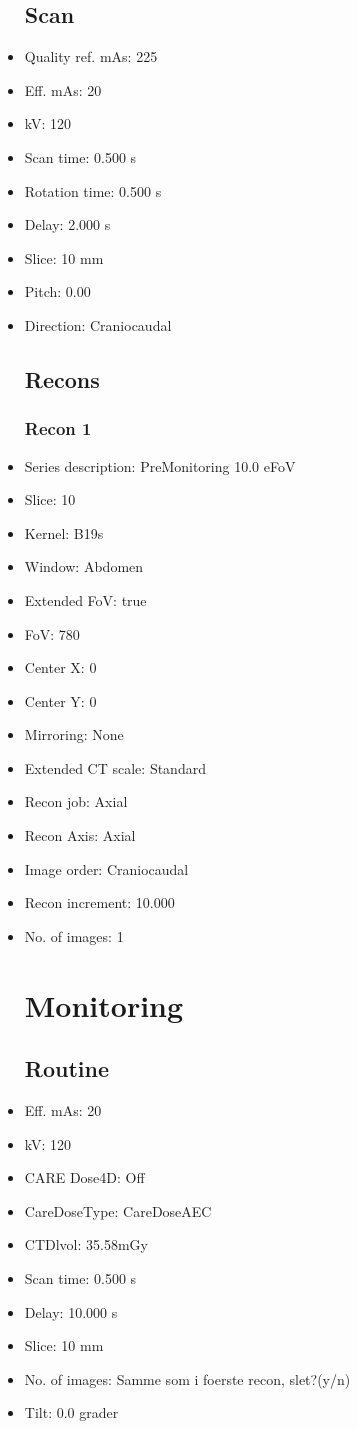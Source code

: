 \documentclass[12pt]{article}
\begin{document}
\begin{itemize}
\subsection{Scan}
\item Quality ref. mAs: 225\item Eff. mAs: 20\item kV: 120\item Scan time: 0.500 s\item Rotation time: 0.500 s\item Delay: 2.000 s\item Slice: 10 mm\item Pitch: 0.00\item Direction: Craniocaudal\subsection{Recons}

\subsubsection{Recon 1}
\item Series description: PreMonitoring 10.0 eFoV
\item Slice: 10
\item Kernel: B19s
\item Window: Abdomen
\item Extended FoV: true
\item FoV: 780
\item Center X: 0
\item Center Y: 0
\item Mirroring: None
\item Extended CT scale: Standard
\item Recon job: Axial
\item Recon Axis: Axial
\item Image order: Craniocaudal
\item Recon increment: 10.000
\item No. of images: 1
\section{Monitoring}
\subsection{Routine}
\item Eff. mAs: 20\item kV: 120\item CARE Dose4D: Off\item CareDoseType: CareDoseAEC\item CTDlvol: 35.58mGy\item Scan time: 0.500 s\item Delay: 10.000 s\item Slice: 10 mm\item No. of images: Samme som i foerste recon, slet?(y/n)\item Tilt: 0.0 grader

\end{itemize}
\end{document}
